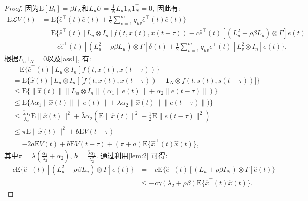 \begin{proof}
        因为$\mathrm{E}[B_t]=\beta I_N$和$L_uU=\frac{1}{N}L_u1_N1_N^\top=0$, 因此有:
        \begin{align}\label{sys:err}
        \nonumber \mathrm{E}\mathcal{L}V(t)&=\mathrm{E}\Big\{\hat{e}^{\top}(t)\dot{\hat{e}}(t)+\frac{1}{2}\sum_{v=1}^{m}q_{uv}\hat{e}^{\top}(t)\hat{e}(t)\Big\}\\
        \nonumber&=\mathrm{E}\Big\{\hat{e}^{\top}(t)[L_{u}\otimes I_n]f(t,x(t),x(t-\tau))
        -c\hat{e}^{\top}(t)[(L^2_u+\rho\beta L_u)\otimes \Gamma]e(t)\\
        &\quad-c\hat{e}^{\top}(t)[(L^2_u+\rho\beta L_u)\otimes \Gamma]{\delta}(t)
        +\frac{1}{2}\sum_{v=1}^{m}q_{uv}e^\top(t)[L^2_{v}\otimes I_n]e(t)\Big\}.
        \end{align}
        根据$L_u1_N=0$以及\autoref{ass1}, 有:
        \begin{align}\label{e1}
        \nonumber&\quad\mathrm{E}\Big\{\hat{e}^{\top}(t)[L_{u}\otimes I_n]f(t,x(t),x(t-\tau))\Big\}\\
        \nonumber &=\mathrm{E}\Big\{\hat{x}(t)[L_{u}\otimes I_n]\big[f(t,x(t),x(t-\tau))-\mathbf{1}_N\otimes f(t,{s}(t),{s}(t-\tau))\big]\Big\}\\
        \nonumber &\leq\mathrm{E}\Big\{\|\hat{x}(t)\|\|L_{u}\otimes I_n\|(\alpha_1\|e(t)\|+\alpha_2\|e(t-\tau)\|)\Big\}\\
        \nonumber &\leq\mathrm{E}\Big\{\bar{\lambda}\alpha_1\|\hat{x}(t)\|\|e(t)\|+\bar{\lambda}\alpha_2\|\hat{x}(t)\|\|e(t-\tau)\|)\Big\}\\
        \nonumber &\leq\frac{\bar{\lambda}\alpha_1}{\lambda_2}\mathrm{E}\|\hat{x}(t)\|^2+\bar{\lambda}\alpha_2(\mathrm{E}\|\hat{x}(t)\|^2+\frac{1}{2}\mathrm{E}\|e(t-\tau)\|^2)\\
        \nonumber &\leq\pi\mathrm{E}\|\hat{x}(t)\|^2+b\mathrm{E}V(t-\tau)\\
        &=-2a\mathrm{E}V(t)+b\mathrm{E}V(t-\tau)+(\pi+a)\mathrm{E}\{\hat{x}^\top(t)\hat{x}(t)\},
        \end{align}
        其中$\pi=\bar{\lambda}(\frac{\alpha_1}{\lambda_2}+\alpha_2)$, $b=\frac{\bar{\lambda}\alpha_2}{\lambda_2^2}$.
        通过利用\autoref{lem:2} 可得:
        \begin{align}\label{e13}
        \nonumber-c\mathrm{E}\Big\{\hat{e}^{\top}(t)[(L^2_u+\rho\beta L_u)\otimes \Gamma]e(t)\Big\}&=-c\mathrm{E}\Big\{\hat{e}^{\top}(t)[(L_u+\rho\beta I_N)\otimes \Gamma]\hat{e}(t)\Big\}\\
        &\leq-c\gamma(\lambda_2+\rho\beta)\mathrm{E}\{\hat{x}^{\top}(t)\hat{x}(t)\}.

\end{align}
\end{proof}
